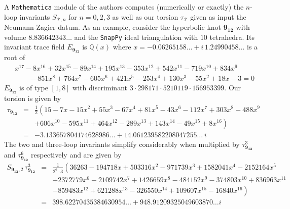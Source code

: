 \documentclass[12pt]{amsart}
\theoremstyle{definition}
\def\BQ{\mathbb Q}
\newcommand{\CT}{\mathcal{T}}
\newcommand{\mb}{\mathbf}
\numberwithin{equation}{section}
\begin{document}
A {\tt Mathematica} module of the authors computes (numerically or exactly)
the $n$-loop invariants $S_{\CT,n}$ for $n=0,2,3$ as well as our torsion
$\tau_{\CT}$ given as input the Neumann-Zagier datum.
As an example, consider the hyperbolic knot $\mb{9_{12}}$ with volume 
$8.836642343\dots$ and the {\tt SnapPy} ideal triangulation with 
$10$ tetrahedra. Its invariant trace field $E_{\mb{9_{12}}}$
is $\BQ(x)$ where 
$x=-0.06265158\dots + i \,1.24990458\dots$ is a root of 
\begin{align*}
&x^{17} - 8 x^{16} + 32 x^{15} - 89 x^{14} + 195 x^{13} - 353 x^{12} + 542 x^{11} - 
719 x^{10} + 834 x^9  \\
& \qquad - 851 x^8 + 764 x^7 - 605 x^6+ 421 x^5 - 
253 x^4 + 130 x^3 - 55 x^2 + 18 x - 3=0
\end{align*}
$E_{\mb{9_{12}}}$ is of type $[1,8]$ with discriminant $3 \cdot 298171 \cdot 5210119
\cdot 156953399$.
Our torsion is given by
\begin{eqnarray*}
\tau_{\mb{9_{12}}}&=& \frac{1}{2}
\left(15 -7 x -15 x^2 + 55 x^3 -67 x^4 + 81 x^5 -43 x^6 -112 x^7 + 303 x^8 -488
x^9 \right. \\ 
& & \left.
+ 606 x^{10} -595 x^{11} + 464 x^{12} -289 x^{13} + 143 x^{14} -49 x^{15} + 8 x^{16}
\right)
\\
&=& -3.133657804174628986\dots + 14.061239582208047255\dots \, i 
\end{eqnarray*}
The two and three-loop invariants simplify considerably when multiplied
by $\tau_{\mb{9_{12}}}^3$ and $\tau_{\mb{9_{12}}}^6$ respectively and are given by
\begin{eqnarray*}
S_{\mb{9_{12}},2}\,\tau_{\mb{9_{12}}}^3&=& 
\frac{1}{2^6 \cdot 3}
\left(36263 -194718 x + 503316 x^2 -971739 x^3 + 1582041 x^{4} -2152164 x^{5} 
\right. \\ 
& & \left.
+ 2372779 x^{6} -2109742 x^{7} + 1426659 x^{8} -484152 x^{9} -374803 x^{10} 
+ 836963 x^{11} 
\right. \\ 
& & \left.
-859483 x^{12} + 621288 x^{13} -326550 x^{14} + 109607 x^{15} 
-16840 x^{16} \right) \\
&=& 398.62270435384630954\dots + 948.91209325049603870\dots i
\end{eqnarray*}
\end{document}
